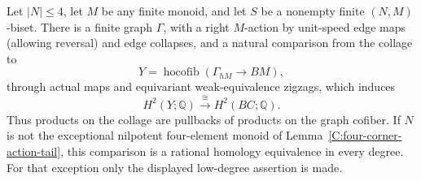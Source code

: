 \begin{proposition}
\label{C:small-opposite-natural-graph-comparison}
Let $|N|\leq4$, let $M$ be any finite monoid, and let $S$
be a nonempty finite $(N,M)$-biset.  There is a finite graph
$\Gamma$, with a right $M$-action by unit-speed edge maps
(allowing reversal) and edge collapses, and a natural
comparison from the collage to
\[
 Y=\operatorname{hocofib}(\Gamma_{hM}\longrightarrow BM),
\]
through actual maps and equivariant weak-equivalence zigzags,
which induces
\[
 H^2(Y;\mathbb Q)\xrightarrow{\;\cong\;}H^2(BC;\mathbb Q).
\]
Thus products on the collage are pullbacks of products on
the graph cofiber.  If $N$ is not the exceptional nilpotent
four-element monoid of Lemma~\ref{C:four-corner-action-tail},
this comparison is a rational homology equivalence in every
degree.  For that exception only the displayed low-degree
assertion is made.
\end{proposition}
